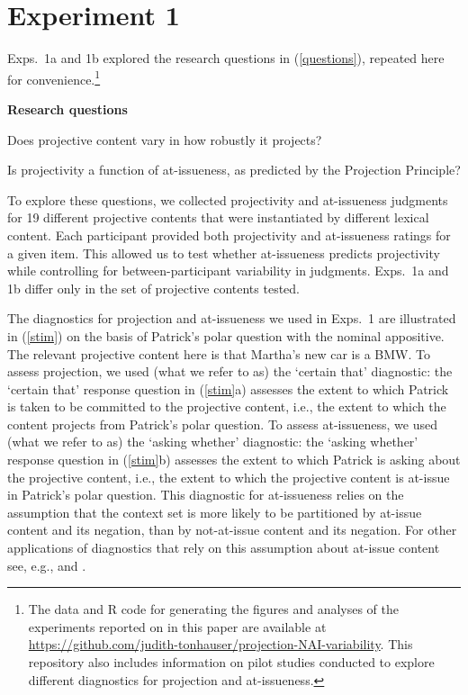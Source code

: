 \documentclass[11pt,fleqn]{article}
\newcommand{\6}{\mbox{$[\hspace*{-.6mm}[$}}
\newcommand{\9}{\mbox{$]\hspace*{-.6mm}]$}}
\begin{document}
\section{Experiment 1}
\label{s3}

Exps.~1a and 1b explored the research questions in (\ref{questions}), repeated here for convenience.\footnote{The
data and R code for generating the figures and analyses
of the experiments reported on in this paper are available at \url{https://github.com/judith-tonhauser/projection-NAI-variability}. This repository also includes information on pilot studies conducted to explore different diagnostics for projection and at-issueness.}

\begin{exe}
\exi{(\ref{questions})} {\bf Research questions}

\begin{xlist} 

\ex Does projective content vary in how robustly it projects?

\ex Is projectivity a function of at-issueness, as predicted by the Projection Principle?
\end{xlist}

\end{exe} 

To explore these questions, we collected projectivity and at-issueness judgments for 19 different projective contents that were instantiated by different lexical content. Each participant provided both projectivity and at-issueness ratings for a given item. This allowed us to test whether  at-issueness predicts projectivity while controlling for between-participant variability in judgments. Exps.~1a and 1b differ only in the set of projective contents tested. 

The diagnostics for projection and at-issueness we used in Exps.~1 are illustrated in (\ref{stim}) on the basis of Patrick's polar question with the nominal appositive. The relevant projective content here is that Martha's new car is a BMW. To assess projection, we used (what we refer to as) the `certain that' diagnostic: the `certain that' response question in (\ref{stim}a) assesses the extent to which Patrick is taken to be committed to the projective content, i.e., the extent to which the content projects from Patrick's polar question. To assess at-issueness, we used (what we refer to as) the `asking whether' diagnostic: the `asking whether' response question in (\ref{stim}b) assesses the extent to which Patrick is asking about the projective content, i.e., the extent to which the projective content is at-issue in Patrick's polar question. This diagnostic for at-issueness relies on the assumption that the context set is more likely to be partitioned by at-issue content and its negation, than by not-at-issue content and its negation. For other applications of diagnostics that rely on this assumption about at-issue content see, e.g., \citealt{amaral-etal07} and \citealt{tonhauser-sula6}.
\end{document}
